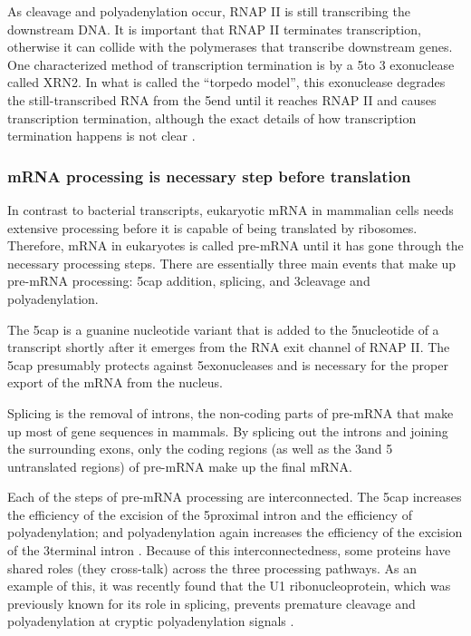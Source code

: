 As cleavage and polyadenylation occur, RNAP II is still transcribing the
downstream DNA. It is important that RNAP II terminates transcription,
otherwise it can collide with the polymerases that transcribe downstream genes.
One characterized method of transcription termination is by a 5\p to 3\p
exonuclease called XRN2. In what is called the ``torpedo model'', this
exonuclease degrades the still-transcribed RNA from the 5\p end until it
reaches RNAP II and causes transcription termination, although the exact
details of how transcription termination happens is not clear
\cite{kuehner_unravelling_2011}.

\subsubsection{mRNA processing is necessary step before translation}
In contrast to bacterial transcripts, eukaryotic mRNA in mammalian cells needs
extensive processing before it is capable of being translated by ribosomes.
Therefore, mRNA in eukaryotes is called pre-mRNA until it has gone through the
necessary processing steps. There are essentially three main events that make
up pre-mRNA processing: 5\p cap addition, splicing, and 3\p cleavage and
polyadenylation.

The 5\p cap is a guanine nucleotide variant that is added to the 5\p nucleotide
of a transcript shortly after it emerges from the RNA exit channel of RNAP II.
The 5\p cap presumably protects against 5\p exonucleases and is necessary for
the proper export of the mRNA from the nucleus.

Splicing is the removal of introns, the non-coding parts of pre-mRNA that make
up most of gene sequences in mammals. By splicing out the introns and joining
the surrounding exons, only the coding regions (as well as the 3\p and 5\p
untranslated regions) of pre-mRNA make up the final mRNA.

Each of the steps of pre-mRNA processing are interconnected. The 5\p cap
increases the efficiency of the excision of the 5\p proximal intron and the
efficiency of polyadenylation; and polyadenylation again increases the
efficiency of the excision of the 3\p terminal intron
\cite{proudfoot_integrating_2002}. Because of this interconnectedness, some
proteins have shared roles (they cross-talk) across the three processing
pathways. As an example of this, it was recently found that the U1
ribonucleoprotein, which was previously known for its role in splicing,
prevents premature cleavage and polyadenylation at cryptic polyadenylation
signals \cite{kaida_u1_2010}.

